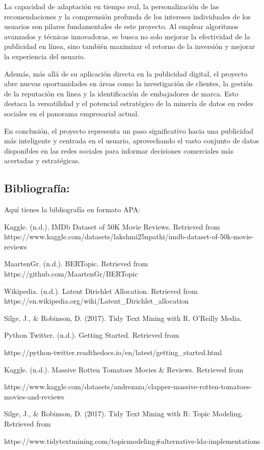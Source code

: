 \documentclass[
  letterpaper,
  DIV=11,
  numbers=noendperiod]{scrartcl}
\begin{document}
La capacidad de adaptación en tiempo real, la personalización de las
recomendaciones y la comprensión profunda de los intereses individuales
de los usuarios son pilares fundamentales de este proyecto. Al emplear
algoritmos avanzados y técnicas innovadoras, se busca no solo mejorar la
efectividad de la publicidad en línea, sino también maximizar el retorno
de la inversión y mejorar la experiencia del usuario.

Además, más allá de su aplicación directa en la publicidad digital, el
proyecto abre nuevas oportunidades en áreas como la investigación de
clientes, la gestión de la reputación en línea y la identificación de
embajadores de marca. Esto destaca la versatilidad y el potencial
estratégico de la minería de datos en redes sociales en el panorama
empresarial actual.

En conclusión, el proyecto representa un paso significativo hacia una
publicidad más inteligente y centrada en el usuario, aprovechando el
vasto conjunto de datos disponibles en las redes sociales para informar
decisiones comerciales más acertadas y estratégicas.

\newpage{}

\subsection{Bibliografía:}\label{bibliografuxeda}

Aquí tienes la bibliografía en formato APA:

Kaggle. (n.d.). IMDb Dataset of 50K Movie Reviews. Retrieved from
https://www.kaggle.com/datasets/lakshmi25npathi/imdb-dataset-of-50k-movie-reviews

MaartenGr. (n.d.). BERTopic. Retrieved from
https://github.com/MaartenGr/BERTopic

Wikipedia. (n.d.). Latent Dirichlet Allocation. Retrieved from
https://en.wikipedia.org/wiki/Latent\_Dirichlet\_allocation

Silge, J., \& Robinson, D. (2017). Tidy Text Mining with R. O'Reilly
Media.

Python Twitter. (n.d.). Getting Started. Retrieved from

https://python-twitter.readthedocs.io/en/latest/getting\_started.html

Kaggle. (n.d.). Massive Rotten Tomatoes Movies \& Reviews. Retrieved
from

https://www.kaggle.com/datasets/andrezaza/clapper-massive-rotten-tomatoes-movies-and-reviews

Silge, J., \& Robinson, D. (2017). Tidy Text Mining with R: Topic
Modeling. Retrieved from

https://www.tidytextmining.com/topicmodeling\#alternative-lda-implementations
\end{document}
